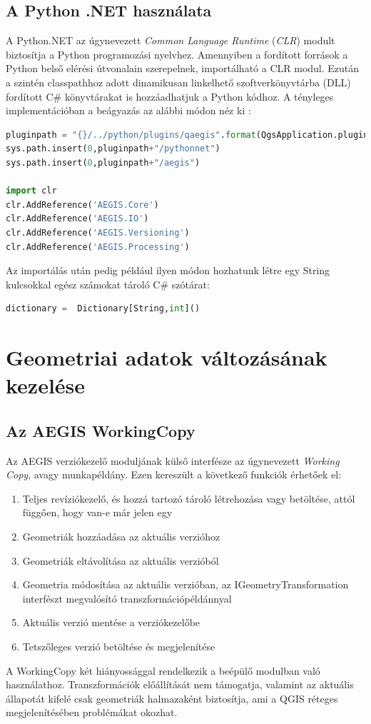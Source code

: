 \subsection{A Python .NET használata}
A Python.NET az úgynevezett \emph{Common Language Runtime} (\emph{CLR}) modult biztosítja a Python programozási nyelvhez. Amennyiben a fordított források a Python belső elérési útvonalain szerepelnek, importálható a CLR modul. Ezután a szintén classpathhoz adott dinamikusan linkelhető szoftverkönyvtárba (DLL) fordított C\# könyvtárakat is hozzáadhatjuk a Python kódhoz. A tényleges implementációban a beágyazás az alábbi módon néz ki :
\begin{lstlisting}[language={python}]
pluginpath = "{}/../python/plugins/qaegis".format(QgsApplication.pluginPath())
sys.path.insert(0,pluginpath+"/pythonnet")
sys.path.insert(0,pluginpath+"/aegis")

import clr
clr.AddReference('AEGIS.Core')
clr.AddReference('AEGIS.IO')
clr.AddReference('AEGIS.Versioning')
clr.AddReference('AEGIS.Processing')
\end{lstlisting}
Az importálás után pedig például ilyen módon hozhatunk létre egy String kulcsokkal egész számokat tároló C\# szótárat:
\begin{lstlisting}[language={python}]
dictionary =  Dictionary[String,int]()
\end{lstlisting}

\section{Geometriai adatok változásának kezelése}
\subsection{Az AEGIS WorkingCopy}
Az AEGIS verziókezelő moduljának külső interfésze az úgynevezett \textit{Working Copy}, avagy munkapéldány. Ezen kereszült a következő funkciók érhetőek el:
\begin{enumerate}
	\item Teljes revíziókezelő, és hozzá tartozó tároló létrehozása vagy betöltése, attól függően, hogy van-e már jelen egy
	\item Geometriák hozzáadása az aktuális verzióhoz
	\item Geometriák eltávolítása az aktuális verzióból
	\item Geometria módosítása az aktuális verzióban, az IGeometryTransformation interfészt megvalósító transzformációpéldánnyal
	\item Aktuális verzió mentése a verziókezelőbe
	\item Tetszőleges verzió betöltése és megjelenítése
\end{enumerate}
A WorkingCopy két hiányossággal rendelkezik a beépülő modulban való használathoz. Transzformációk előállítását nem támogatja, valamint az aktuális állapotát kifelé csak geometriák halmazaként biztosítja, ami a QGIS réteges megjelenítésében problémákat okozhat.
